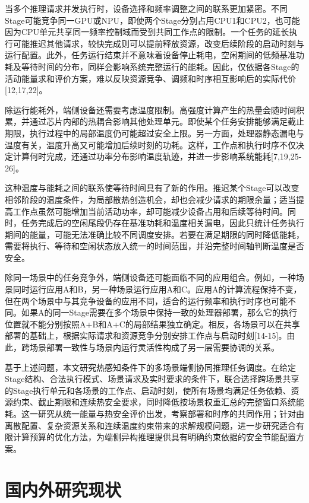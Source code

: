 当多个推理请求并发执行时，设备选择和频率调整之间的联系更加紧密。不同Stage可能竞争同一GPU或NPU，即使两个Stage分别占用CPU1和CPU2，也可能因为CPU单元共享同一频率控制域而受到共同工作点的限制。一个任务的延长执行可能推迟其他请求，较快完成则可以提前释放资源，改变后续阶段的启动时刻与运行配置。此外，任务运行结束并不意味着设备停止耗电，空闲期间的低频基准功耗及等待时间的分布，同样会影响系统完整运行的能耗。因此，仅依据各Stage的活动能量求和评价方案，难以反映资源竞争、调频和时序相互影响后的实际代价{[}12,17,22{]}。

除运行能耗外，端侧设备还需要考虑温度限制。高强度计算产生的热量会随时间积累，并通过芯片内部的热耦合影响其他处理单元。即使某个任务安排能够满足截止期限，执行过程中的局部温度仍可能超过安全上限。另一方面，处理器静态漏电与温度有关，温度升高又可能增加后续时刻的功耗。这样，工作点和执行时序不仅决定计算何时完成，还通过功率分布影响温度轨迹，并进一步影响系统能耗{[}7,19,25-26{]}。

这种温度与能耗之间的联系使等待时间具有了新的作用。推迟某个Stage可以改变相邻阶段的温度条件，为局部散热创造机会，却也会减少请求的期限余量；适当提高工作点虽然可能增加当前活动功率，却可能减少设备占用和后续等待时间。同时，任务完成后的空闲尾段仍存在基准功耗和温度相关漏电，因此只统计任务执行期间的能量，可能无法准确比较不同调度安排。若要在满足期限的同时降低能耗，需要将执行、等待和空闲状态放入统一的时间范围，并沿完整时间轴判断温度是否安全。

除同一场景中的任务竞争外，端侧设备还可能面临不同的应用组合。例如，一种场景同时运行应用A和B，另一种场景运行应用A和C。应用A的计算流程保持不变，但在两个场景中与其竞争设备的应用不同，适合的运行频率和执行时序也可能不同。如果A的同一Stage需要在多个场景中保持一致的处理器部署，那么它的执行位置就不能分别按照A+B和A+C的局部结果独立确定。相反，各场景可以在共享部署的基础上，根据实际请求和资源竞争分别安排工作点与启动时刻{[}14-15{]}。由此，跨场景部署一致性与场景内运行灵活性构成了另一层需要协调的关系。

基于上述问题，本文研究热感知条件下的多场景端侧协同推理任务调度。在给定Stage结构、合法执行模式、场景请求及实时要求的条件下，联合选择跨场景共享的Stage执行单元和各场景的工作点、启动时刻，使所有场景均满足任务依赖、资源约束、截止期限和连续热安全要求，同时降低按场景权重汇总的完整窗口系统能耗。这一研究从统一能量与热安全评价出发，考察部署和时序的共同作用；针对由离散配置、复杂资源关系和连续温度约束带来的求解规模问题，进一步研究适合有限计算预算的优化方法，为端侧异构推理提供具有明确约束依据的安全节能配置方案。

\section{国内外研究现状}\label{ux56fdux5185ux5916ux7814ux7a76ux73b0ux72b6}

